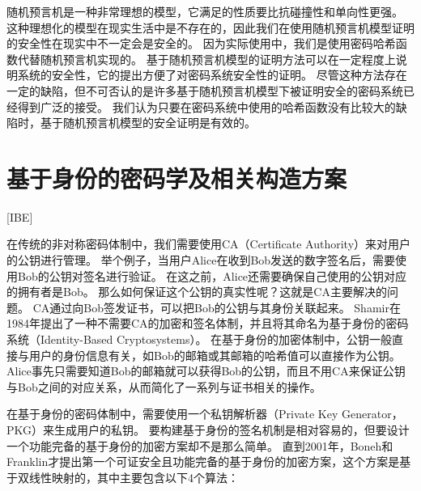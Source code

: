 随机预言机是一种非常理想的模型，它满足的性质要比抗碰撞性和单向性更强。
这种理想化的模型在现实生活中是不存在的，因此我们在使用随机预言机模型证明的安全性在现实中不一定会是安全的。
因为实际使用中，我们是使用密码哈希函数代替随机预言机实现的。
基于随机预言机模型的证明方法可以在一定程度上说明系统的安全性，它的提出方便了对密码系统安全性的证明。
尽管这种方法存在一定的缺陷，但不可否认的是许多基于随机预言机模型下被证明安全的密码系统已经得到广泛的接受\cite{koblitz2015random}。
我们认为只要在密码系统中使用的哈希函数没有比较大的缺陷时，基于随机预言机模型的安全证明是有效的。

\section{基于身份的密码学及相关构造方案}[IBE]

在传统的非对称密码体制中，我们需要使用CA（Certificate Authority）来对用户的公钥进行管理。
举个例子，当用户Alice在收到Bob发送的数字签名后，需要使用Bob的公钥对签名进行验证。
在这之前，Alice还需要确保自己使用的公钥对应的拥有者是Bob。
那么如何保证这个公钥的真实性呢？这就是CA主要解决的问题。
CA通过向Bob签发证书，可以把Bob的公钥与其身份关联起来。
Shamir在1984年提出了一种不需要CA的加密和签名体制\cite{shamir1984identity}，并且将其命名为基于身份的密码系统（Identity-Based Cryptosystems）。
在基于身份的加密体制中，公钥一般直接与用户的身份信息有关，如Bob的邮箱或其邮箱的哈希值可以直接作为公钥。
Alice事先只需要知道Bob的邮箱就可以获得Bob的公钥，而且不用CA来保证公钥与Bob之间的对应关系，从而简化了一系列与证书相关的操作。

在基于身份的密码体制中，需要使用一个私钥解析器（Private Key Generator，PKG）来生成用户的私钥。
要构建基于身份的签名机制是相对容易的，但要设计一个功能完备的基于身份的加密方案却不是那么简单。
直到2001年，Boneh和Franklin才提出第一个可证安全且功能完备的基于身份的加密方案\cite{boneh2001identity}，这个方案是基于双线性映射的，其中主要包含以下4个算法：

